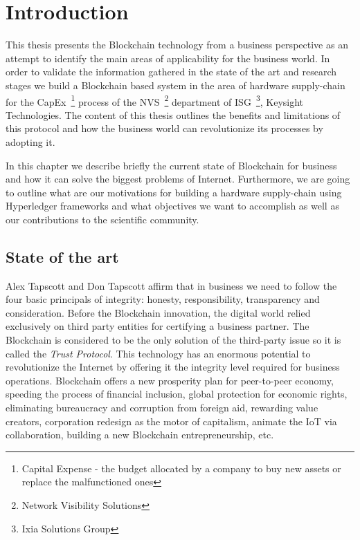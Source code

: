 \chapter{Introduction}
\label{chapter:intro}

This thesis presents the Blockchain technology from a business perspective as an attempt to identify the main areas of applicability for the business world.
In order to validate the information gathered in the state of the art and research stages we build a Blockchain based system in the area of hardware supply-chain for the CapEx~\footnote{Capital Expense - the budget allocated by a company to buy new assets or replace the malfunctioned ones} process of the NVS~\footnote{Network Visibility Solutions} department of ISG~\footnote{Ixia Solutions Group}, Keysight Technologies. The content of this thesis outlines the benefits and limitations of this protocol and how the business world can revolutionize its processes by adopting it.

In this chapter we describe briefly the current state of Blockchain for business and how it can solve the biggest problems of Internet. Furthermore, we are going to outline what are our motivations for building a hardware supply-chain using Hyperledger frameworks and what objectives we want to accomplish as well as our contributions to the scientific community.

\section{State of the art}
\label{sec:intro-section1}
Alex Tapscott and Don Tapscott \cite{1tapscott} affirm that in business we need to follow the four basic principals of integrity: honesty, responsibility, transparency and consideration. Before the Blockchain innovation, the digital world relied exclusively on third party entities for certifying a business partner. The Blockchain is considered to be the only solution of the third-party issue so it is called the \emph{Trust Protocol}. This technology has an enormous potential to revolutionize the Internet by offering it the integrity level required for business operations.
Blockchain offers a new prosperity plan for peer-to-peer economy, speeding the process of financial inclusion, global protection for economic rights, eliminating bureaucracy and corruption from foreign aid, rewarding value creators, corporation redesign as the motor of capitalism, animate the IoT via collaboration, building a new Blockchain entrepreneurship, etc.

